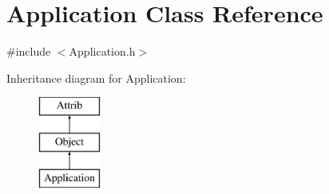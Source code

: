 \hypertarget{classApplication}{}\section{Application Class Reference}
\label{classApplication}


{\ttfamily \#include $<$Application.\+h$>$}

Inheritance diagram for Application\+:\begin{figure}[H]
\begin{center}
\leavevmode
\includegraphics[height=3.000000cm]{classApplication}
\end{center}
\end{figure}
